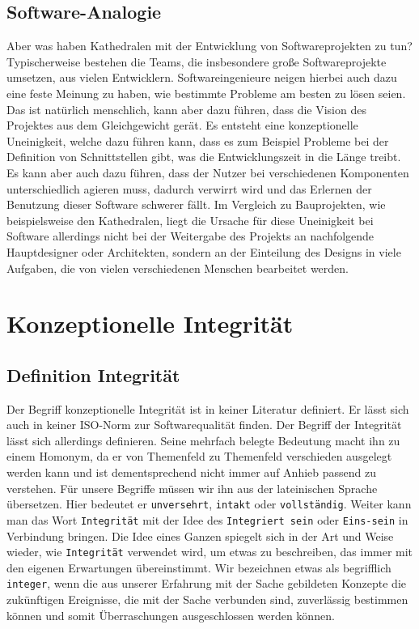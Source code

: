 \documentclass[a4paper, ngerman, 12pt, usenames, dvipsnames]{article}
\begin{document}
\subsection{Software-Analogie}
Aber was haben Kathedralen mit der Entwicklung von Softwareprojekten zu tun? Typischerweise bestehen die Teams, die insbesondere große Softwareprojekte umsetzen, aus vielen Entwicklern. Softwareingenieure neigen hierbei auch dazu eine feste Meinung zu haben, wie bestimmte Probleme am besten zu lösen seien. Das ist natürlich menschlich, kann aber dazu führen, dass die Vision des Projektes aus dem Gleichgewicht gerät. Es entsteht eine konzeptionelle Uneinigkeit, welche dazu führen kann, dass es zum Beispiel Probleme bei der Definition von Schnittstellen gibt, was die Entwicklungszeit in die Länge treibt. Es kann aber auch dazu führen, dass der Nutzer bei verschiedenen Komponenten unterschiedlich agieren muss, dadurch verwirrt wird und das Erlernen der Benutzung dieser Software schwerer fällt. Im Vergleich zu Bauprojekten, wie beispielsweise den Kathedralen, liegt die Ursache für diese Uneinigkeit bei Software allerdings nicht bei der Weitergabe des Projekts an nachfolgende Hauptdesigner oder Architekten, sondern an der Einteilung des Designs in viele Aufgaben, die von vielen verschiedenen Menschen bearbeitet werden. \cite{Brooks1975}

\section{Konzeptionelle Integrität}
\subsection{Definition Integrität}
Der Begriff konzeptionelle Integrität ist in keiner Literatur definiert.
Er lässt sich auch in keiner ISO-Norm zur Softwarequalität finden. 
Der Begriff der Integrität lässt sich allerdings definieren.
Seine mehrfach belegte Bedeutung macht ihn zu einem Homonym, da er von Themenfeld zu Themenfeld verschieden ausgelegt werden kann und ist dementsprechend nicht immer auf Anhieb passend zu verstehen. 
Für unsere Begriffe müssen wir ihn aus der lateinischen Sprache übersetzen. Hier bedeutet er \texttt{unversehrt}, \texttt{intakt} oder \texttt{vollständig}. 
Weiter kann man das Wort \texttt{Integrität} mit der Idee des \texttt{Integriert sein} oder \texttt{Eins-sein} in Verbindung bringen.
Die Idee eines Ganzen spiegelt sich in der Art und Weise wieder, wie \texttt{Integrität} verwendet wird, um etwas zu beschreiben, das immer mit den eigenen Erwartungen übereinstimmt.
Wir bezeichnen etwas als begrifflich \texttt{integer}, wenn die aus unserer Erfahrung mit der Sache gebildeten Konzepte die zukünftigen Ereignisse, die mit der Sache verbunden sind, zuverlässig bestimmen können und somit Überraschungen ausgeschlossen werden können.
\end{document}
